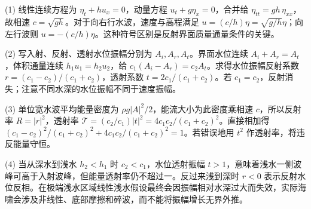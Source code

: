 (1) 线性连续方程为 \(\eta_t+h u_x=0\)，动量方程 \(u_t+g\eta_x=0\)，合并给 \(\eta_{tt}=gh\,\eta_{xx}\)，故相速 \(c=\sqrt{gh}\)。对于向右行水波，速度与高程满足 \(u=(c/h)\eta=\sqrt{g/h}\eta\)；向左行波则 \(u=-(c/h)\eta\)。这种符号区别是反射界面质量通量条件的关键。

(2) 写入射、反射、透射水位振幅分别为 \(A_i,A_r,A_t\)。界面水位连续 \(A_i+A_r=A_t\)，体积通量连续 \(h_1u_1=h_2u_2\)，给 \(c_1(A_i-A_r)=c_2A_t\)。求得水位振幅反射系数 \(r=(c_1-c_2)/(c_1+c_2)\)，透射系数 \(t=2c_1/(c_1+c_2)\)。若 \(c_1=c_2\)，反射消失；注意不同水深的水位振幅不同于速度振幅。

(3) 单位宽水波平均能量密度为 \(\rho g|A|^2/2\)，能流大小为此密度乘相速 \(c\)，所以反射率 \(R=|r|^2\)，透射率 \(\mathcal T=(c_2/c_1)|t|^2=4c_1c_2/(c_1+c_2)^2\)。直接相加得 \((c_1-c_2)^2/(c_1+c_2)^2+4c_1c_2/(c_1+c_2)^2=1\)。若错误地用 \(t^2\) 作透射率，将违反能量守恒。

(4) 当从深水到浅水 \(h_2<h_1\) 时 \(c_2<c_1\)，水位透射振幅 \(t>1\)，意味着浅水一侧波峰可高于入射波峰，但能量透射率仍不超过一。反过来浅到深时 \(r<0\) 表示反射水位反相。在极端浅水区域线性浅水假设最终会因振幅相对水深过大而失效，实际海啸会涉及非线性、底部摩擦和碎波，而不能将振幅增长无界外推。
